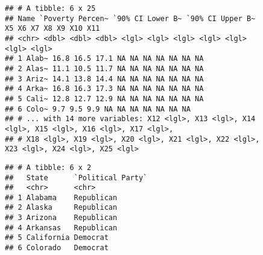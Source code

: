 \documentclass[]{article}
\newenvironment{Shaded}{\begin{snugshade}}{\end{snugshade}}
\newcommand{\CommentTok}[1]{\textcolor[rgb]{0.56,0.35,0.01}{\textit{#1}}}
\newcommand{\DataTypeTok}[1]{\textcolor[rgb]{0.13,0.29,0.53}{#1}}
\newcommand{\KeywordTok}[1]{\textcolor[rgb]{0.13,0.29,0.53}{\textbf{#1}}}
\newcommand{\NormalTok}[1]{#1}
\newcommand{\StringTok}[1]{\textcolor[rgb]{0.31,0.60,0.02}{#1}}
\begin{document}
\begin{verbatim}
## # A tibble: 6 x 25
## Name `Poverty Percen~ `90% CI Lower B~ `90% CI Upper B~
X5 X6 X7 X8 X9 X10 X11
## <chr> <dbl> <dbl> <dbl> <lgl> <lgl> <lgl> <lgl> <lgl>
<lgl> <lgl>
## 1 Alab~ 16.8 16.5 17.1 NA NA NA NA NA NA NA
## 2 Alas~ 11.1 10.5 11.7 NA NA NA NA NA NA NA
## 3 Ariz~ 14.1 13.8 14.4 NA NA NA NA NA NA NA
## 4 Arka~ 16.8 16.3 17.3 NA NA NA NA NA NA NA
## 5 Cali~ 12.8 12.7 12.9 NA NA NA NA NA NA NA
## 6 Colo~ 9.7 9.5 9.9 NA NA NA NA NA NA NA
## # ... with 14 more variables: X12 <lgl>, X13 <lgl>, X14
<lgl>, X15 <lgl>, X16 <lgl>, X17 <lgl>,
## # X18 <lgl>, X19 <lgl>, X20 <lgl>, X21 <lgl>, X22 <lgl>,
X23 <lgl>, X24 <lgl>, X25 <lgl>
\end{verbatim}

\begin{Shaded}
\end{Shaded}

\begin{verbatim}
## # A tibble: 6 x 2
##   State      `Political Party`
##   <chr>      <chr>            
## 1 Alabama    Republican       
## 2 Alaska     Republican       
## 3 Arizona    Republican       
## 4 Arkansas   Republican       
## 5 California Democrat         
## 6 Colorado   Democrat
\end{verbatim}
\end{document}
